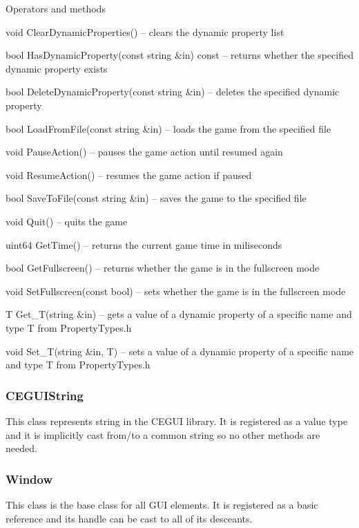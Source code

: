 \begin{titled-itemize}{Operators and methods}
  \item void ClearDynamicProperties() -- clears the dynamic property list
  \item bool HasDynamicProperty(const string \&in) const -- returns whether the specified dynamic property exists
  \item bool DeleteDynamicProperty(const string \&in) -- deletes the specified dynamic property
  \item bool LoadFromFile(const string \&in) -- loads the game from the specified file
  \item void PauseAction() -- pauses the game action until resumed again
  \item void ResumeAction() -- resumes the game action if paused
  \item bool SaveToFile(const string \&in) -- saves the game to the specified file
  \item void Quit() -- quits the game
  \item uint64 GetTime() -- returns the current game time in miliseconds
  \item bool GetFullscreen() -- returns whether the game is in the fullscreen mode
  \item void SetFullscreen(const bool) -- sets whether the game is in the fullscreen mode
  \item T Get\_T(string \&in) -- gets a value of a dynamic property of a specific name and type T from PropertyTypes.h
  \item void Set\_T(string \&in, T) -- sets a value of a dynamic property of a specific name and type T from PropertyTypes.h
\end{titled-itemize}

\subsubsection{CEGUIString}

This class represents string in the CEGUI library. It is registered as a value type and it is implicitly cast from/to a common string so no other methods are needed.

\subsubsection{Window}

This class is the base class for all GUI elements. It is registered as a basic reference and its handle can be cast to all of its desceants.

